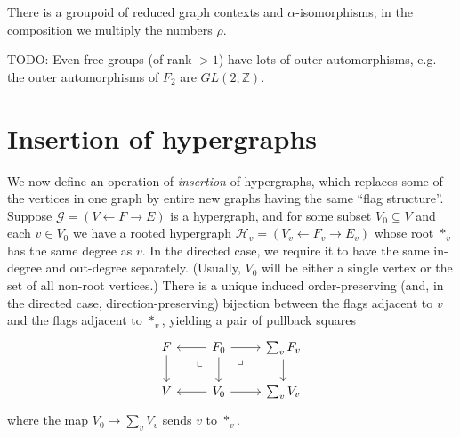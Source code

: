 \documentclass{article}
\theoremstyle{definition}
\theoremstyle{remark}
\def\G{\mathcal{G}}
\def\H{\mathcal{H}}
\newcommand{\drpullback}[1][dr]{\ar[#1,phantom,near start,"\lrcorner"]}
\newcommand{\dlpullback}[1][dl]{\ar[#1,phantom,near start,"\llcorner"]}
\let\ot\leftarrow
\begin{document}
There is a groupoid of reduced graph contexts and $\alpha$-isomorphisms; in the composition we multiply the numbers $\rho$.

TODO: Even free groups (of rank $>1$) have lots of outer automorphisms, e.g. the outer automorphisms of $F_2$ are $GL(2,\mathbb{Z})$.


\section{Insertion of hypergraphs}
\label{sec:insertion}

We now define an operation of \emph{insertion} of hypergraphs, which replaces some of the vertices in one graph by entire new graphs having the same ``flag structure''.
Suppose $\G = (V\ot F \to E)$ is a hypergraph, and for some subset $V_0 \subseteq V$ and each $v\in V_0$ we have a rooted hypergraph $\H_v = (V_v \ot F_v \to E_v)$ whose root $\ast_v$ has the same degree as $v$.
In the directed case, we require it to have the same in-degree and out-degree separately.
(Usually, $V_0$ will be either a single vertex or the set of all non-root vertices.)
There is a unique induced order-preserving (and, in the directed case, direction-preserving) bijection between the flags adjacent to $v$ and the flags adjacent to $\ast_v$, yielding a pair of pullback squares
\[
\begin{tikzcd}
  F \ar[d] & F_0 \ar[l] \dlpullback \ar[d] \ar[r] \drpullback & \sum_v F_v \ar[d]\\
  V & V_0 \ar[l] \ar[r] & \sum_v V_v
\end{tikzcd}
\]
where the map $V_0 \to \sum_v V_v$ sends $v$ to $\ast_v$.
\end{document}
